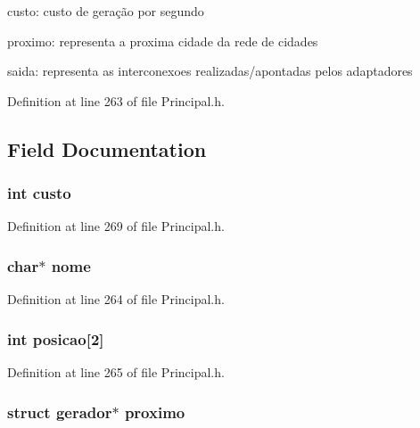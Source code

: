 custo\-: custo de geração por segundo

proximo\-: representa a proxima cidade da rede de cidades

saida\-: representa as interconexoes realizadas/apontadas pelos adaptadores 

Definition at line 263 of file Principal.\-h.



\subsection{Field Documentation}
\hypertarget{structgerador_a420b800f5434e6488ebc8a2b81d3b74b}{
\subsubsection[{custo}]{\setlength{\rightskip}{0pt plus 5cm}int custo}}\label{structgerador_a420b800f5434e6488ebc8a2b81d3b74b}


Definition at line 269 of file Principal.\-h.

\hypertarget{structgerador_ae2a0f66178bb1c4d42e2b70ec9426ccb}{
\subsubsection[{nome}]{\setlength{\rightskip}{0pt plus 5cm}char$\ast$ nome}}\label{structgerador_ae2a0f66178bb1c4d42e2b70ec9426ccb}


Definition at line 264 of file Principal.\-h.

\hypertarget{structgerador_a7e30d633898517077a4363ad6fade5b6}{
\subsubsection[{posicao}]{\setlength{\rightskip}{0pt plus 5cm}int posicao\mbox{[}2\mbox{]}}}\label{structgerador_a7e30d633898517077a4363ad6fade5b6}


Definition at line 265 of file Principal.\-h.

\hypertarget{structgerador_afc2cefcafa0e3935e9e7641ef91e6b2d}{
\subsubsection[{proximo}]{\setlength{\rightskip}{0pt plus 5cm}struct {\bf gerador}$\ast$ proximo}}\label{structgerador_afc2cefcafa0e3935e9e7641ef91e6b2d}


